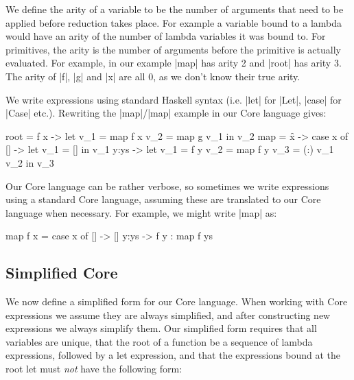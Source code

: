 \documentclass[draft]{sigplanconf}
\begin{document}
We define the arity of a variable to be the number of arguments that need to be applied before reduction takes place. For example a variable bound to a lambda would have an arity of the number of lambda variables it was bound to. For primitives, the arity is the number of arguments before the primitive is actually evaluated. For example, in our example |map| has arity 2 and |root| has arity 3. The arity of |f|, |g| and |x| are all 0, as we don't know their true arity.

We write expressions using standard Haskell syntax (i.e. |let| for |Let|, |case| for |Case| etc.). Rewriting the |map|/|map| example in our Core language gives:

\begin{code}
root = \g f x ->  let  v_1 =  map f x
                       v_2 =  map g v_1
                  in   v_2
map = \f x -> case  x of
                    []    ->   let  v_1 = []
                               in   v_1
                    y:ys  ->   let  v_1 = f y
                                    v_2 = map f y
                                    v_3 = (:) v_1 v_2
                               in   v_3
\end{code}

Our Core language can be rather verbose, so sometimes we write expressions using a standard Core language, assuming these are translated to our Core language when necessary. For example, we might write |map| as:

\begin{code}
map f x = case  x of
                []    -> []
                y:ys  -> f y : map f ys
\end{code}

\subsection{Simplified Core}
\label{sec:simplify}

We now define a simplified form for our Core language. When working with Core expressions we assume they are always simplified, and after constructing new expressions we always simplify them. Our simplified form requires that all variables are unique, that the root of a function be a sequence of lambda expressions, followed by a let expression, and that the expressions bound at the root let must \textit{not} have the following form:
\end{document}
